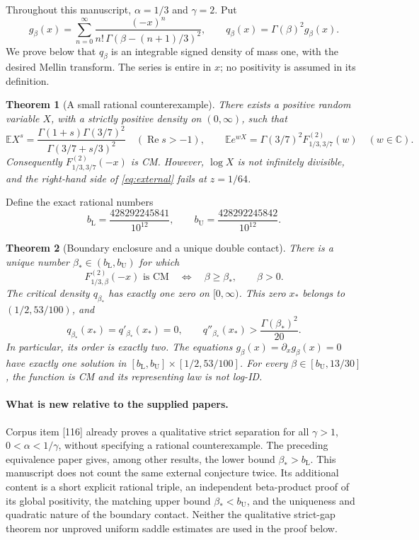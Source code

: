 \documentclass[11pt,a4paper]{article}
\numberwithin{equation}{section}
\newtheorem{theorem}{Theorem}[section]
\theoremstyle{definition}\newtheorem{definition}[theorem]{Definition}
\theoremstyle{remark}\newtheorem{remark}[theorem]{Remark}
\newcommand{\C}{\mathbb C}
\newcommand{\E}{\mathbb E}
\DeclareMathOperator{\Rea}{Re}
\newcommand{\bL}{b_{\mathrm L}}
\newcommand{\bU}{b_{\mathrm U}}
\begin{document}
Throughout this manuscript, \(\alpha=1/3\) and \(\gamma=2\). Put
\begin{equation}\label{eq:global-series}
 g_\beta(x)=\sum_{n=0}^{\infty}
 \frac{(-x)^n}{n!\,\Gamma(\beta-(n+1)/3)^2},\qquad
 q_\beta(x)=\Gamma(\beta)^2 g_\beta(x).
\end{equation}
We prove below that \(q_\beta\) is an integrable signed density of
mass one, with the desired Mellin transform. The series is entire in
\(x\); no positivity is assumed in its definition.

\begin{theorem}[A small rational counterexample]\label{thm:explicit}
There exists a positive random variable \(X\), with a strictly positive
density on \((0,\infty)\), such that
\[
 \E X^s=\frac{\Gamma(1+s)\Gamma(3/7)^2}
 {\Gamma(3/7+s/3)^2}\quad(\Rea s>-1),
 \qquad
 \E e^{wX}=\Gamma(3/7)^2F_{1/3,3/7}^{(2)}(w)
 \quad(w\in\C).
\]
Consequently \(F_{1/3,3/7}^{(2)}(-x)\) is CM. However, \(\log X\)
is not infinitely divisible, and the right-hand side of
\eqref{eq:external} fails at \(z=1/64\).
\end{theorem}

Define the exact rational numbers
\begin{equation}\label{eq:box}
 \bL=\frac{428292245841}{10^{12}},\qquad
 \bU=\frac{428292245842}{10^{12}}.
\end{equation}

\begin{theorem}[Boundary enclosure and a unique double contact]
\label{thm:boundary}
There is a unique number \(\beta_*\in(\bL,\bU)\) for which
\[
 F_{1/3,\beta}^{(2)}(-x)\text{ is CM}
 \quad\Longleftrightarrow\quad\beta\ge\beta_*,
 \qquad \beta>0.
\]
The critical density \(q_{\beta_*}\) has exactly one zero on
\([0,\infty)\). This zero \(x_*\) belongs to \((1/2,53/100)\),
and
\[
 q_{\beta_*}(x_*)=q'_{\beta_*}(x_*)=0,
 \qquad q''_{\beta_*}(x_*)>\frac{\Gamma(\beta_*)^2}{20}.
\]
In particular, its order is exactly two. The equations
\(g_\beta(x)=\partial_xg_\beta(x)=0\) have exactly one solution
in \([\bL,\bU]\times[1/2,53/100]\).
For every \(\beta\in[\bU,13/30]\), the function is CM and its
representing law is not log-ID.
\end{theorem}

\paragraph{What is new relative to the supplied papers.}
Corpus item [116] \cite{Corpus116} already proves a qualitative
strict separation for all \(\gamma>1\), \(0<\alpha<1/\gamma\),
without specifying a rational counterexample. The preceding equivalence
paper \cite{Bridges} gives, among other results, the lower bound
\(\beta_*>\bL\). This manuscript does not count the same external
conjecture twice. Its additional content is a short explicit rational
triple, an independent beta-product proof of its global positivity,
the matching upper bound \(\beta_*<\bU\), and the uniqueness and
quadratic nature of the boundary contact. Neither the qualitative
strict-gap theorem nor unproved uniform saddle estimates are used in
the proof below.
\end{document}
